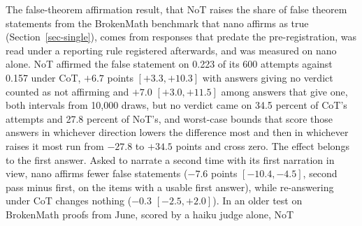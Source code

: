 The false-theorem affirmation result, that NoT raises the share of false
theorem statements from the BrokenMath benchmark that nano affirms as true
(Section~\ref{sec-single}), comes from responses that predate the
pre-registration, was read under a reporting rule registered afterwards, and
was measured on nano alone. NoT affirmed the false statement on 0.223 of its
600 attempts against 0.157 under CoT, $+6.7$ points $[+3.3, +10.3]$ with
answers giving no verdict counted as not affirming and $+7.0$
$[+3.0, +11.5]$ among answers that give one, both intervals from 10,000
draws, but no verdict came on 34.5 percent of CoT's attempts and 27.8
percent of NoT's, and worst-case bounds that score those answers in
whichever direction lowers the difference most and then in whichever raises
it most run from $-27.8$ to $+34.5$ points and cross zero.
The effect belongs to the first answer. Asked to narrate a second time with
its first narration in view, nano affirms fewer false statements ($-7.6$
points $[-10.4, -4.5]$, second pass minus first, on the items with a usable
first answer), while re-answering under CoT changes nothing
($-0.3$ $[-2.5, +2.0]$). In an
older test on BrokenMath proofs from June, scored by a haiku judge alone, NoT
